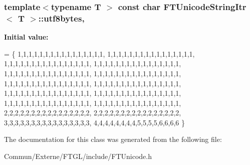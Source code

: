 \subsubsection[{\texorpdfstring{utf8bytes}{utf8bytes}}]{\setlength{\rightskip}{0pt plus 5cm}template$<$typename T $>$ const char {\bf F\+T\+Unicode\+String\+Itr}$<$ T $>$\+::utf8bytes\hspace{0.3cm}{\ttfamily [static]}, {\ttfamily [private]}}\hypertarget{class_f_t_unicode_string_itr_a44cf6cec1fedb64eaaebbe88fa87de2c}{}\label{class_f_t_unicode_string_itr_a44cf6cec1fedb64eaaebbe88fa87de2c}
{\bfseries Initial value\+:}
\begin{DoxyCode}
= \{
  1,1,1,1,1,1,1,1,1,1,1,1,1,1,1,1, 1,1,1,1,1,1,1,1,1,1,1,1,1,1,1,1,
  1,1,1,1,1,1,1,1,1,1,1,1,1,1,1,1, 1,1,1,1,1,1,1,1,1,1,1,1,1,1,1,1,
  1,1,1,1,1,1,1,1,1,1,1,1,1,1,1,1, 1,1,1,1,1,1,1,1,1,1,1,1,1,1,1,1,
  1,1,1,1,1,1,1,1,1,1,1,1,1,1,1,1, 1,1,1,1,1,1,1,1,1,1,1,1,1,1,1,1,
  1,1,1,1,1,1,1,1,1,1,1,1,1,1,1,1, 1,1,1,1,1,1,1,1,1,1,1,1,1,1,1,1,
  1,1,1,1,1,1,1,1,1,1,1,1,1,1,1,1, 1,1,1,1,1,1,1,1,1,1,1,1,1,1,1,1,
  2,2,2,2,2,2,2,2,2,2,2,2,2,2,2,2, 2,2,2,2,2,2,2,2,2,2,2,2,2,2,2,2,
  3,3,3,3,3,3,3,3,3,3,3,3,3,3,3,3, 4,4,4,4,4,4,4,4,5,5,5,5,6,6,6,6
\}
\end{DoxyCode}


The documentation for this class was generated from the following file\+:\begin{DoxyCompactItemize}
\item 
Commun/\+Externe/\+F\+T\+G\+L/include/F\+T\+Unicode.\+h\end{DoxyCompactItemize}
